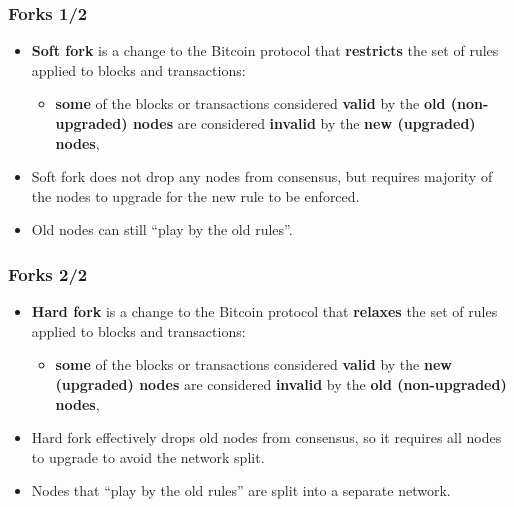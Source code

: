 \documentclass{beamer}
\begin{document}
\begin{frame}
  \frametitle{Forks 1/2}
  \begin{itemize}
  \item \textbf{Soft fork} is a change to the Bitcoin protocol that
    \textbf{restricts} the set of rules applied to blocks and transactions:
    \begin{itemize}
    \item \textbf{some} of the blocks or transactions considered \textbf{valid} by the
      \textbf{old (non-upgraded) nodes} are considered \textbf{invalid} by the
      \textbf{new (upgraded) nodes},
    \end{itemize}
  \item Soft fork does not drop any nodes from consensus, but requires majority
    of the nodes to upgrade for the new rule to be enforced.
  \item Old nodes can still ``play by the old rules''.
  \end{itemize}
\end{frame}

\begin{frame}
  \frametitle{Forks 2/2}
  \begin{itemize}
  \item \textbf{Hard fork} is a change to the Bitcoin protocol that
    \textbf{relaxes} the set of rules applied to blocks and transactions:
    \begin{itemize}
    \item \textbf{some} of the blocks or transactions considered \textbf{valid}
      by the \textbf{new (upgraded) nodes} are considered \textbf{invalid} by
      the \textbf{old (non-upgraded) nodes},
    \end{itemize}
  \item Hard fork effectively drops old nodes from consensus, so it requires all
    nodes to upgrade to avoid the network split.
  \item Nodes that ``play by the old rules'' are split into a separate network.
  \end{itemize}
\end{frame}
\end{document}
